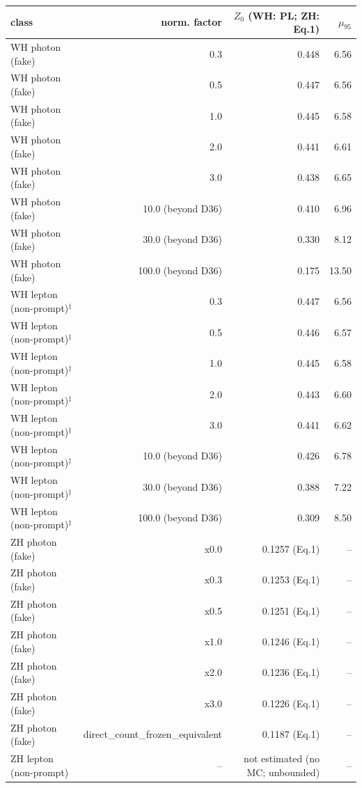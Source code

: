 \begin{table}[ht]\centering\small
\begin{tabular}{lrrr}\hline
class & norm. factor & $Z_0$ (WH: PL; ZH: Eq.1) & $\mu_{95}$ \\\hline
WH photon (fake) & 0.3 & 0.448 & 6.56 \\
WH photon (fake) & 0.5 & 0.447 & 6.56 \\
WH photon (fake) & 1.0 & 0.445 & 6.58 \\
WH photon (fake) & 2.0 & 0.441 & 6.61 \\
WH photon (fake) & 3.0 & 0.438 & 6.65 \\
WH photon (fake) & 10.0 (beyond D36) & 0.410 & 6.96 \\
WH photon (fake) & 30.0 (beyond D36) & 0.330 & 8.12 \\
WH photon (fake) & 100.0 (beyond D36) & 0.175 & 13.50 \\
WH lepton (non-prompt)$^\ddagger$ & 0.3 & 0.447 & 6.56 \\
WH lepton (non-prompt)$^\ddagger$ & 0.5 & 0.446 & 6.57 \\
WH lepton (non-prompt)$^\ddagger$ & 1.0 & 0.445 & 6.58 \\
WH lepton (non-prompt)$^\ddagger$ & 2.0 & 0.443 & 6.60 \\
WH lepton (non-prompt)$^\ddagger$ & 3.0 & 0.441 & 6.62 \\
WH lepton (non-prompt)$^\ddagger$ & 10.0 (beyond D36) & 0.426 & 6.78 \\
WH lepton (non-prompt)$^\ddagger$ & 30.0 (beyond D36) & 0.388 & 7.22 \\
WH lepton (non-prompt)$^\ddagger$ & 100.0 (beyond D36) & 0.309 & 8.50 \\
ZH photon (fake) & x0.0 & 0.1257 (Eq.1) & -- \\
ZH photon (fake) & x0.3 & 0.1253 (Eq.1) & -- \\
ZH photon (fake) & x0.5 & 0.1251 (Eq.1) & -- \\
ZH photon (fake) & x1.0 & 0.1246 (Eq.1) & -- \\
ZH photon (fake) & x2.0 & 0.1236 (Eq.1) & -- \\
ZH photon (fake) & x3.0 & 0.1226 (Eq.1) & -- \\
ZH photon (fake) & direct\_count\_frozen\_equivalent & 0.1187 (Eq.1) & -- \\
ZH lepton (non-prompt) & -- & not estimated (no MC; unbounded) & -- \\\hline

\end{tabular}
\end{table}
